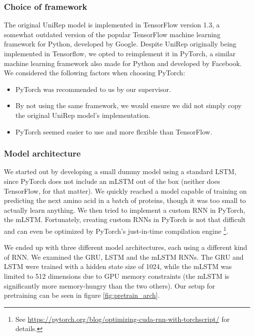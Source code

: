 \documentclass[a4paper,12pt]{article}
\begin{document}
\subsubsection{Choice of framework}
The original UniRep model is implemented in TensorFlow version 1.3, a somewhat outdated version of the popular TensorFlow machine learning framework for Python, developed by Google. Despite UniRep originally being implemented in Tensorflow, we opted to reimplement it in PyTorch, a similar machine learning framework also made for Python and developed by Facebook. We considered the following factors when choosing PyTorch:
\begin{itemize}
    \item PyTorch was recommended to us by our supervisor.
    \item By not using the same framework, we would ensure we did not simply copy the original UniRep model's implementation.
    \item PyTorch seemed easier to use and more flexible than TensorFlow.
\end{itemize}

\subsubsection{Model architecture}
We started out by developing a small dummy model using a standard LSTM, since PyTorch does not include an mLSTM out of the box (neither does TensorFlow, for that matter). We quickly reached a model capable of training on predicting the next amino acid in a batch of proteins, though it was too small to actually learn anything. We then tried to implement a custom RNN in PyTorch, the mLSTM. Fortunately, creating custom RNNs in PyTorch is not that difficult and can even be optimized by PyTorch's just-in-time compilation engine \footnote{See \url{https://pytorch.org/blog/optimizing-cuda-rnn-with-torchscript/} for details.}.

We ended up with three different model architectures, each using a different kind of RNN. We examined the GRU, LSTM and the mLSTM RNNs. The GRU and LSTM were trained with a hidden state size of 1024, while the mLSTM was limited to 512 dimensions due to GPU memory constraints (the mLSTM is significantly more memory-hungry than the two others). Our setup for pretraining can be seen in figure \ref{fig:pretrain_arch}.

\end{document}
